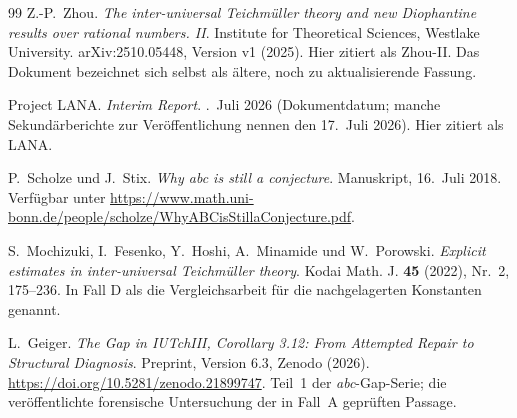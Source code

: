 \documentclass[11pt,a4paper]{article}
\theoremstyle{definition}
\begin{document}
\begin{thebibliography}{99}
Z.-P.~Zhou.
\newblock \emph{The inter-universal Teichmüller theory and new Diophantine
results over rational numbers. II}.
\newblock Institute for Theoretical Sciences, Westlake University.
\newblock arXiv:2510.05448, Version v1 (2025). Hier zitiert als Zhou-II. Das
Dokument bezeichnet sich selbst als ältere, noch zu aktualisierende Fassung.

Project LANA.
\newblock \emph{Interim Report}.
.~Juli 2026 (Dokumentdatum; manche Sekundärberichte zur
Veröffentlichung nennen den 17.~Juli 2026). Hier zitiert als LANA.

P.~Scholze und J.~Stix.
\newblock \emph{Why abc is still a conjecture}.
\newblock Manuskript, 16.~Juli 2018. Verfügbar unter
\url{https://www.math.uni-bonn.de/people/scholze/WhyABCisStillaConjecture.pdf}.

S.~Mochizuki, I.~Fesenko, Y.~Hoshi, A.~Minamide und W.~Porowski.
\newblock \emph{Explicit estimates in inter-universal Teichmüller theory}.
\newblock Kodai Math. J. \textbf{45} (2022), Nr.~2, 175--236.
\newblock In Fall D als die Vergleichsarbeit für die nachgelagerten Konstanten
genannt.

L.~Geiger.
\newblock \emph{The Gap in IUTchIII, Corollary 3.12: From Attempted Repair to
Structural Diagnosis}.
\newblock Preprint, Version 6.3, Zenodo (2026).
\newblock \url{https://doi.org/10.5281/zenodo.21899747}.
\newblock Teil~1 der \emph{abc}-Gap-Serie; die veröffentlichte forensische
Untersuchung der in Fall~A geprüften Passage.


\end{thebibliography}
\end{document}

